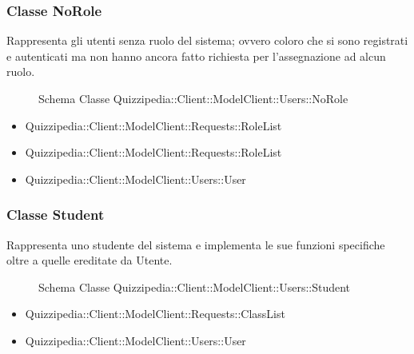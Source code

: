 \subsubsection{Classe NoRole}
Rappresenta gli utenti senza ruolo del sistema; ovvero coloro che si sono registrati e autenticati ma non hanno ancora fatto richiesta per l'assegnazione ad alcun ruolo.
\begin{figure}[H]
\centering
\noindent{}
\caption{Schema Classe Quizzipedia::Client::ModelClient::Users::NoRole}
\end{figure}
\begin{itemize}
\item Quizzipedia::Client::ModelClient::Requests::RoleList
\end{itemize}
\begin{itemize}
\item Quizzipedia::Client::ModelClient::Requests::RoleList
\item Quizzipedia::Client::ModelClient::Users::User
\end{itemize}
\subsubsection{Classe Student}
Rappresenta uno studente del sistema e implementa le sue funzioni specifiche oltre a quelle ereditate da Utente.
\begin{figure}[H]
\centering
\noindent{}
\caption{Schema Classe Quizzipedia::Client::ModelClient::Users::Student}
\end{figure}
\begin{itemize}
\item Quizzipedia::Client::ModelClient::Requests::ClassList
\item Quizzipedia::Client::ModelClient::Users::User
\end{itemize}
